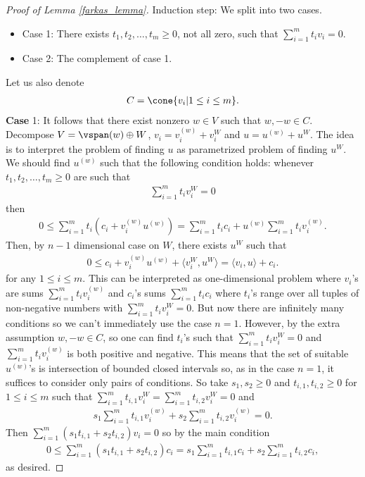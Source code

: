 \begin{proof}[Proof of Lemma \ref{farkas_lemma}]
	Induction step: We split into two cases.
	\begin{itemize}
		\item Case 1: There exists $t_{1}, t_{2}, \ldots, t_{m} \geq 0$, not all zero, such that $\sum_{i = 1}^{m} t_{i} v_{i} = 0$.
		\item Case 2: The complement of case 1.
	\end{itemize}
	Let us also denote
	\begin{align*}
		C = \cone \{v_{i} | 1 \leq i \leq m\}.
	\end{align*}
	\textbf{Case} 1: It follows that there exist nonzero $w \in V$ such that $w, -w \in C$. Decompose $V = \vspan(w) \oplus W$, $v_{i} = v_{i}^{(w)} + v_{i}^{W}$ and $u = u^{(w)} + u^{W}$. The idea is to interpret the problem of finding $u$ as parametrized problem of finding $u^{W}$. We should find $u^{(w)}$ such that the following condition holds: whenever $t_{1}, t_{2}, \ldots, t_{m} \geq 0$ are such that
	\begin{align*}
		\sum_{i = 1}^{m} t_{i} v_{i}^{W} = 0
	\end{align*}
	then
	\begin{align*}
		0 \leq \sum_{i = 1}^{m} t_{i} (c_{i} + v_{i}^{(w)} u^{(w)}) = \sum_{i = 1}^{m} t_{i} c_{i} + u^{(w)}\sum_{i = 1}^{m} t_{i} v_{i}^{(w)}.
	\end{align*}
	Then, by $n - 1$ dimensional case on $W$, there exists $u^{W}$ such that
	\begin{align*}
		0 \leq c_{i} + v_{i}^{(w)} u^{(w)} + \langle v_{i}^{W}, u^{W} \rangle = \langle v_{i}, u \rangle + c_{i}.
	\end{align*}
	for any $1 \leq i \leq m$. This can be interpreted as one-dimensional problem where $v_{i}$'s are sums $\sum_{i = 1}^{m} t_{i} v_{i}^{(w)}$ and $c_{i}$'s sums $\sum_{i = 1}^{m} t_{i} c_{i}$ where $t_{i}$'s range over all tuples of non-negative numbers with $\sum_{i = 1}^{m} t_{i} v_{i}^{W} = 0$. But now there are infinitely many conditions so we can't immediately use the case $n = 1$. However, by the extra assumption $w, -w \in C$, so one can find $t_{i}$'s such that $\sum_{i = 1}^{m} t_{i} v_{i}^{W} = 0$ and $\sum_{i = 1}^{m} t_{i} v_{i}^{(w)}$ is both positive and negative. This means that the set of suitable $u^{(w)}$'s is intersection of bounded closed intervals so, as in the case $n = 1$, it suffices to consider only pairs of conditions. So take $s_{1}, s_{2} \geq 0$ and $t_{i, 1}, t_{i, 2} \geq 0$ for $1 \leq i \leq m$ such that $\sum_{i = 1}^{m} t_{i, 1} v_{i}^{W} = \sum_{i = 1}^{m} t_{i, 2} v_{i}^{W} = 0$ and
	\begin{align*}
		s_{1} \sum_{i = 1}^{m} t_{i, 1} v_{i}^{(w)} + s_{2} \sum_{i = 1}^{m} t_{i, 2} v_{i}^{(w)} = 0.
	\end{align*}
	Then $\sum_{i = 1}^{m} \left(s_{1} t_{i, 1} + s_{2} t_{i, 2} \right) v_{i} = 0$ so by the main condition
	\begin{align*}
		0 \leq \sum_{i = 1}^{m} \left(s_{1} t_{i, 1} + s_{2} t_{i, 2} \right) c_{i} = s_{1} \sum_{i = 1}^{m} t_{i, 1} c_{i} + s_{2}\sum_{i = 1}^{m} t_{i, 2} c_{i},
	\end{align*}
	as desired.


\end{proof}

